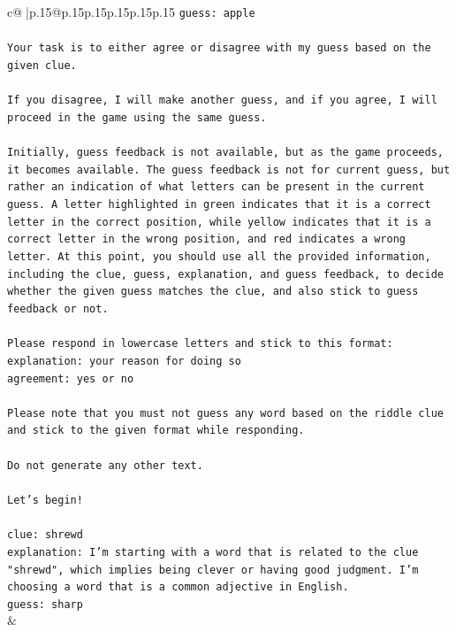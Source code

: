 \documentclass{article}
\begin{document}
{\begin{supertabular}{c@{$\;$}|p{.15\linewidth}@{}p{.15\linewidth}p{.15\linewidth}p{.15\linewidth}p{.15\linewidth}p{.15\linewidth}}
{{{\texttt{guess: apple} \\
\\ 
\texttt{Your task is to either agree or disagree with my guess based on the given clue.} \\
\\ 
\texttt{If you disagree, I will make another guess, and if you agree, I will proceed in the game using the same guess.} \\
\\ 
\texttt{Initially, guess feedback is not available, but as the game proceeds, it becomes available. The guess feedback is not for current guess, but rather an indication of what letters can be present in the current guess. A letter highlighted in green indicates that it is a correct letter in the correct position, while yellow indicates that it is a correct letter in the wrong position, and red indicates a wrong letter. At this point, you should use all the provided information, including the clue, guess, explanation, and guess feedback, to decide whether the given guess matches the clue, and also stick to guess feedback or not.} \\
\\ 
\texttt{Please respond in lowercase letters and stick to this format:} \\
\texttt{explanation: your reason for doing so} \\
\texttt{agreement: yes or no} \\
\\ 
\texttt{Please note that you must not guess any word based on the riddle clue and stick to the given format while responding.} \\
\\ 
\texttt{Do not generate any other text.} \\
\\ 
\texttt{Let's begin!} \\
\\ 
\texttt{clue: shrewd} \\
\texttt{explanation: I'm starting with a word that is related to the clue "shrewd", which implies being clever or having good judgment. I'm choosing a word that is a common adjective in English.} \\
\texttt{guess: sharp} \\
            }
        }
    }
    & \\ \\


\end{supertabular}}
\end{document}
